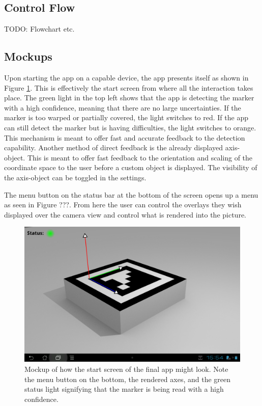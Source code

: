 \documentclass[a4paper,twoside]{article}
\begin{document}
\subsection{Control Flow}

TODO: Flowchart etc.

\subsection{Mockups}

Upon starting the app on a capable device, the app presents itself as shown in Figure \ref{fig:start_mockup}.
This is effectively the start screen from where all the interaction takes place.
The green light in the top left shows that the app is detecting the marker with a high confidence, meaning that there are no large uncertainties.
If the marker is too warped or partially covered, the light switches to red.
If the app can still detect the marker but is having difficulties, the light switches to orange.
This mechanism is meant to offer fast and accurate feedback to the detection capability.
Another method of direct feedback is the already displayed axis-object.
This is meant to offer fast feedback to the orientation and scaling of the coordinate space to the user before a custom object is displayed.
The visibility of the axis-object can be toggled in the settings.

The menu button on the status bar at the bottom of the screen opens up a menu as seen in Figure ???.
From here the user can control the overlays they wish displayed over the camera view and control what is rendered into the picture.

\begin{figure}
	\centering
	\includegraphics[width=15cm]{images/start_mockup.png}
	\caption[Start screen mockup.]{Mockup of how the start screen of the final app might look. Note the menu button on the bottom, the rendered axes, and the green status light signifying that the marker is being read with a high confidence.}
	\label{fig:start_mockup}
\end{figure}
\end{document}
